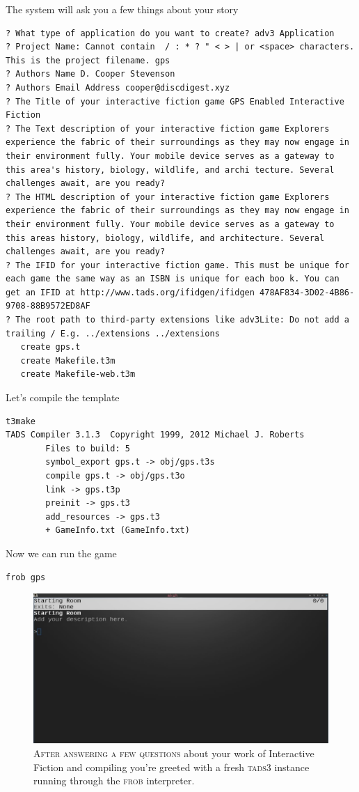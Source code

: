 The system will ask you a few things about your story
\begin{lstlisting}
? What type of application do you want to create? adv3 Application
? Project Name: Cannot contain  / : * ? " < > | or <space> characters. This is the project filename. gps
? Authors Name D. Cooper Stevenson
? Authors Email Address cooper@discdigest.xyz
? The Title of your interactive fiction game GPS Enabled Interactive Fiction
? The Text description of your interactive fiction game Explorers experience the fabric of their surroundings as they may now engage in their environment fully. Your mobile device serves as a gateway to this area's history, biology, wildlife, and archi tecture. Several challenges await, are you ready?
? The HTML description of your interactive fiction game Explorers experience the fabric of their surroundings as they may now engage in their environment fully. Your mobile device serves as a gateway to this areas history, biology, wildlife, and architecture. Several challenges await, are you ready? 
? The IFID for your interactive fiction game. This must be unique for each game the same way as an ISBN is unique for each boo k. You can get an IFID at http://www.tads.org/ifidgen/ifidgen 478AF834-3D02-4B86-9708-88B9572ED8AF   
? The root path to third-party extensions like adv3Lite: Do not add a trailing / E.g. ../extensions ../extensions
   create gps.t
   create Makefile.t3m
   create Makefile-web.t3m
\end{lstlisting}
Let's compile the template
\begin{lstlisting}
t3make
TADS Compiler 3.1.3  Copyright 1999, 2012 Michael J. Roberts
        Files to build: 5
        symbol_export gps.t -> obj/gps.t3s
        compile gps.t -> obj/gps.t3o
        link -> gps.t3p
        preinit -> gps.t3
        add_resources -> gps.t3
        + GameInfo.txt (GameInfo.txt)
\end{lstlisting}
Now we can run the game
\begin{lstlisting}
frob gps
\end{lstlisting}
\begin{figure}[h]                                                           
 \includegraphics[width=\linewidth]{./media/images/new_text_game.pdf}%
  \scriptsize{\textsc{\\After answering a few questions} about your work of
    Interactive Fiction and compiling  you're greeted with a fresh
    \textsc{tads3} instance running through the \textsc{frob} interpreter.}
  \label{fig:new_text_game}%
\end{figure}                                                                
